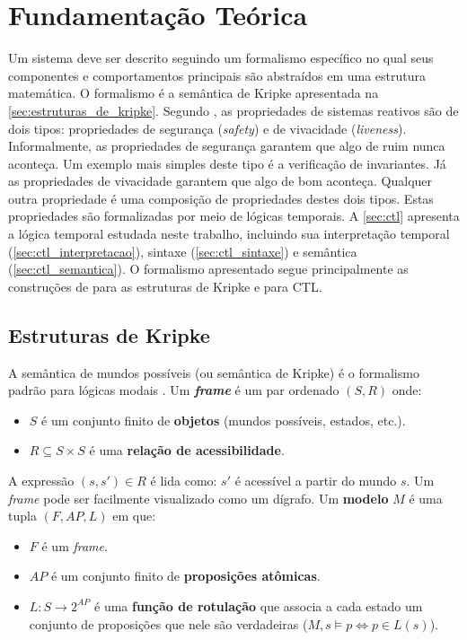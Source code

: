 \documentclass[cic,tc]{infufrgs}
\begin{document}
	\chapter{Fundamentação Teórica}
	
	Um sistema deve ser descrito seguindo um formalismo específico no qual seus componentes e comportamentos principais são abstraídos em uma estrutura matemática. O formalismo é a semântica de Kripke apresentada na \autoref{sec:estruturas_de_kripke}. Segundo , as propriedades de sistemas reativos são de dois tipos: propriedades de segurança (\textit{safety}) e de vivacidade (\textit{liveness}). Informalmente, as propriedades de segurança garantem que algo de ruim nunca aconteça. Um exemplo mais simples deste tipo é a verificação de invariantes. Já as propriedades de vivacidade garantem que algo de bom aconteça. Qualquer outra propriedade é uma composição de propriedades destes dois tipos. 
	Estas propriedades são formalizadas por meio de lógicas temporais. 
	A \autoref{sec:ctl} apresenta a lógica temporal estudada neste trabalho, incluindo sua interpretação temporal (\autoref{sec:ctl_interpretacao}), sintaxe (\autoref{sec:ctl_sintaxe}) e semântica (\autoref{sec:ctl_semantica}). 
	O formalismo apresentado segue 
	principalmente as construções de  para as estruturas de Kripke e  para CTL.
	
	\section{Estruturas de Kripke}
	\label{sec:estruturas_de_kripke}
	
	A semântica de mundos possíveis (ou semântica de Kripke) é o formalismo padrão para lógicas modais \cite{fittingFirstOrderModalLogic2023}. Um \textit{\textbf{frame}} é um par ordenado $(S, R)$ onde:   
	\begin{itemize}
		\item $S$ é um conjunto finito de \textbf{objetos} (mundos possíveis, estados, etc.).
		\item $R \subseteq S \times S$ é uma \textbf{relação de acessibilidade}.
	\end{itemize}
	\par
	A expressão $(s,s')\in R$ é lida como: $s'$ é acessível a partir do mundo $s$. Um \textit{frame} pode ser facilmente visualizado como um dígrafo. Um \textbf{modelo} $M$ é uma tupla $(F, AP, L)$ em que:
	\begin{itemize}
		\item $F$ é um \textit{frame}.
		\item $AP$ é um conjunto finito de \textbf{proposições atômicas}.
		\item $L: S \to 2^{AP}$ é uma \textbf{função de rotulação} que associa a cada estado um conjunto de proposições que nele são verdadeiras ($M,s\models p\iff p\in L(s)$).
	\end{itemize}
	
\end{document}
